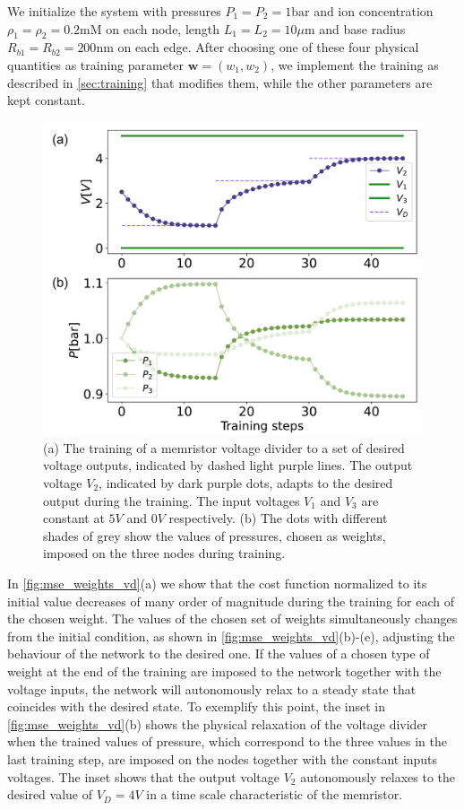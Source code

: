 \documentclass[reprint,superscriptaddress,prb,showkeys]{revtex4-2}
\newcommand{\brac}[1]{\left(#1 \right)} %
\begin{document}
We initialize the system with pressures $P_1 =  P_2 = 1 \text{bar}$ and ion concentration $\rho_1 = \rho_2 = 0.2 \text{mM}$ on each node, length $L_1 = L_2 = 10\mu \text{m}$ and base radius  $R_{b1} = R_{b2} = 200 \text{nm}$ on each edge. After choosing one of these four physical quantities as training parameter $\boldsymbol{w} = \brac{w_1, w_2}$, we implement the training as described in \cref{sec:training} that modifies them, while the other parameters are kept constant. 
\begin{figure}[b]
    \centering
    \includegraphics[width=0.8\columnwidth]{plots/voltage_divider/evolution_targets.pdf}
    \caption{(a) The training of a memristor voltage divider to a set of desired voltage outputs, indicated by dashed light purple lines. The output voltage $V_2$, indicated by dark purple dots, adapts to the desired output during the training. The input voltages $V_1$ and $V_3$ are constant at $5V$ and $0V$ respectively. (b) The dots with different shades of grey show the values of pressures, chosen as weights, imposed on the three nodes during training.}\label{fig:evolution_targets}
\end{figure}
In \cref{fig:mse_weights_vd}(a) we show that the cost function normalized to its initial value decreases of many order of magnitude during the training for each of the chosen weight. The values of the chosen set of weights simultaneously changes from the initial condition, as shown in \cref{fig:mse_weights_vd}(b)-(e), adjusting the behaviour of the network to the desired one. If the values of a chosen type of weight at the end of the training are imposed to the network together with the voltage inputs, the network will autonomously relax to a steady state that coincides with the desired state. To exemplify this point, the inset in \cref{fig:mse_weights_vd}(b) shows the physical relaxation of the voltage divider when the trained values of pressure, which correspond to the three values in the last training step, are imposed on the nodes together with the constant inputs voltages. The inset shows that the output voltage $V_2$ autonomously relaxes to the desired value of $V_D=4V$ in a time scale characteristic of the memristor.
\end{document}
